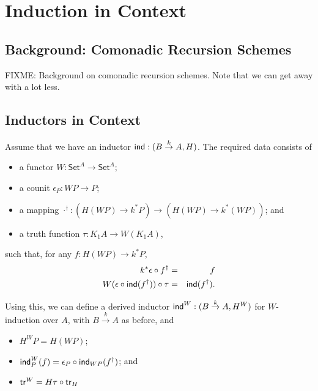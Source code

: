 \documentclass{amsart}
\newcommand{\Set}{\mathsf{Set}}
\begin{document}

\section{Induction in Context}

\subsection{Background: Comonadic Recursion Schemes}

FIXME: Background on comonadic recursion schemes. Note that we can get
away with a lot less.

\subsection{Inductors in Context}

Assume that we have an inductor $\mathsf{ind} : (B \stackrel{k}\to A, H)$. The
required data consists of
\begin{itemize}
\item a functor $W : \Set^A \to \Set^A$;
\item a counit $\epsilon_P : WP \to P$;
\item a mapping $\cdot^\dagger : (H(WP) \to k^*P) \to (H(WP) \to k^*(WP))$; and
\item a truth function $\tau : K_1A \to W(K_1A)$,
\end{itemize}
such that, for any $f : H(WP) \to k^*P$,
\begin{eqnarray}
  k^*\epsilon \circ f^\dagger & = & f \\
  W(\epsilon \circ \mathsf{ind}(f^\dagger)) \circ \tau &=& \mathsf{ind}(f^\dagger).
\end{eqnarray}

Using this, we can define a derived inductor $\mathsf{ind}^W : (B
\stackrel{k}\to A, H^W)$ for $W$-induction over $A$, with $B
\stackrel{k}\to A$ as before, and
\begin{itemize}
\item $H^WP = H(WP)$;
\item $\mathsf{ind}^W_P(f) = \epsilon_P \circ \mathsf{ind}_{WP}(f^\dagger)$; and
\item $\mathsf{tr}^W = H\tau \circ \mathsf{tr}_H$
\end{itemize}


\end{document}

